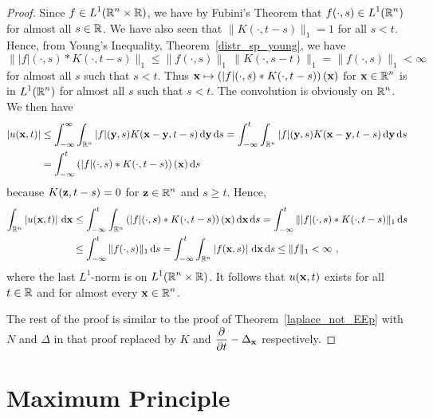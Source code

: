 \begin{proof}
Since $\displaystyle f\in L^1(\mathbb{R}^n\times \mathbb{R})$, we have by Fubini's
Theorem that $\displaystyle f(\cdot, s) \in L^1(\mathbb{R}^n)$ for almost all
$s\in \mathbb{R}$.  We have also seen that $\| K(\cdot, t-s) \|_1 = 1$ for
all $s<t$.  Hence, from 
Young's Inequality, Theorem~\ref{distr_sp_young}, we have
\[
\| |f|(\cdot,s) \ast K(\cdot, t-s) \|_1 \leq \|f(\cdot, s)\|_1\,
\|K(\cdot, s-t)\|_1 = \|f(\cdot, s)\|_1 < \infty
\]
for almost all $s$ such that $s<t$.  Thus
$\displaystyle \mathbf{x} \mapsto \left( |f|(\cdot,s) \ast K(\cdot, t-s)
\right)(\mathbf{x})$ for $\displaystyle \mathbf{x} \in \mathbb{R}^n$ is in
$\displaystyle L^1(\mathbb{R}^n)$ for almost all $s$ such that $s<t$.  The
convolution is obviously on $\displaystyle \mathbb{R}^n$.  We then have
\begin{align*}
\left| u(\mathbf{x},t)\right| &\leq
\int_{-\infty}^\infty \int_{\mathbb{R}^n} |f|(\mathbf{y},s)
K(\mathbf{x}-\mathbf{y}, t-s) \,\mathrm{d}{\mathbf{y}} \,\mathrm{d}{s}
= \int_{-\infty}^t \int_{\mathbb{R}^n} |f|(\mathbf{y},s)
K(\mathbf{x}-\mathbf{y}, t-s) \,\mathrm{d}{\mathbf{y}} \,\mathrm{d}{s} \\
&= \int_{-\infty}^t \left( |f|(\cdot,s) \ast K(\cdot, t-s)
\right)(\mathbf{x}) \,\mathrm{d}{s}
\end{align*}
because $K(\mathbf{z}, t-s) = 0$ for $\displaystyle \mathbf{z}\in \mathbb{R}^n$
and $s\geq t$.  Hence,
\begin{align*}
\int_{\mathbb{R}^n} \left| u(\mathbf{x},t) \right| \,\mathrm{d}{\mathbf{x}} 
&\leq \int_{-\infty}^t \int_{\mathbb{R}^n} \left( |f|(\cdot,s) \ast K(\cdot, t-s)
\right)(\mathbf{x}) \,\mathrm{d}{\mathbf{x}} \,\mathrm{d}{s}
= \int_{-\infty}^t \| |f|(\cdot,s) \ast K(\cdot, t-s) \|_1 \,\mathrm{d}{s} \\
&\leq \int_{-\infty}^t \|f(\cdot, s)\|_1 \,\mathrm{d}{s}
= \int_{-\infty}^t \int_{\mathbb{R}^n} \left| f(\mathbf{x},s)\right| \,\mathrm{d}{\mathbf{x}}\,\mathrm{d}{s}
\leq \|f\|_1 < \infty \  ,
\end{align*}
where the last $\displaystyle L^1$-norm is on
$\displaystyle L^1(\mathbb{R}^n\times \mathbb{R})$.  It follows
that $u(\mathbf{x},t)$ exists for all $t \in \mathbb{R}$ and for almost every
$\displaystyle \mathbf{x} \in \mathbb{R}^n$.

The rest of the proof is similar to the proof of
Theorem~\ref{laplace_not_EEp} with $N$ and $\Delta$ in that proof
replaced by $K$ and $\displaystyle \frac{\partial{}}{\partial t} - \Delta_{\mathbf{x}}$
respectively.
\end{proof}

\section{Maximum Principle}

